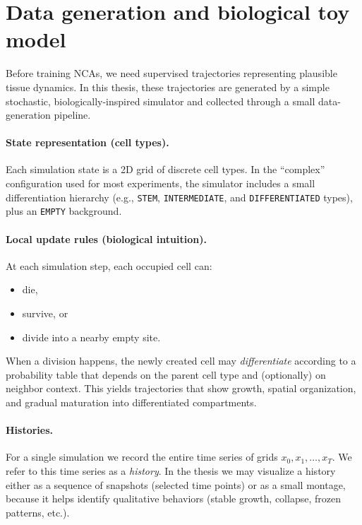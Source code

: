 \section{Data generation and biological toy model}
\label{sec:impl:data}

Before training NCAs, we need supervised trajectories representing plausible tissue dynamics.
In this thesis, these trajectories are generated by a simple stochastic, biologically-inspired simulator and collected through a small data-generation pipeline.

\paragraph{State representation (cell types).}
Each simulation state is a 2D grid of discrete cell types.
In the ``complex'' configuration used for most experiments, the simulator includes a small differentiation hierarchy (e.g., \texttt{STEM}, \texttt{INTERMEDIATE}, and \texttt{DIFFERENTIATED} types), plus an \texttt{EMPTY} background.

\paragraph{Local update rules (biological intuition).}
At each simulation step, each occupied cell can:
\begin{itemize}
  \item die,
  \item survive, or
  \item divide into a nearby empty site.
\end{itemize}
When a division happens, the newly created cell may \emph{differentiate} according to a probability table that depends on the parent cell type and (optionally) on neighbor context.
This yields trajectories that show growth, spatial organization, and gradual maturation into differentiated compartments.

\paragraph{Histories.}
For a single simulation we record the entire time series of grids \(x_0, x_1, \dots, x_T\).
We refer to this time series as a \emph{history}.
In the thesis we may visualize a history either as a sequence of snapshots (selected time points) or as a small montage, because it helps identify qualitative behaviors (stable growth, collapse, frozen patterns, etc.).

